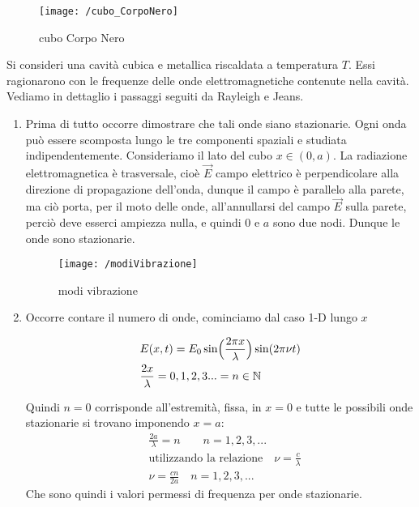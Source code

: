 \begin{figure}[h]
\centering
\texttt{[image: /cubo\_CorpoNero]}
\caption{cubo Corpo Nero}
\end{figure}

Si consideri una cavità cubica e metallica riscaldata a temperatura $T$.
Essi ragionarono con le frequenze delle onde elettromagnetiche contenute nella cavità.
Vediamo in dettaglio i passaggi seguiti da Rayleigh e Jeans.

\begin{enumerate}[label=\Roman{*}.]

\item Prima di tutto occorre dimostrare che tali onde siano stazionarie.
Ogni onda può essere scomposta lungo le tre componenti spaziali e studiata indipendentemente. 
Consideriamo il lato del cubo $x \in (0, a)$.
La radiazione elettromagnetica è trasversale, cioè $\vec{E}$ campo elettrico è perpendicolare alla direzione di propagazione dell'onda, dunque il campo è parallelo alla parete, ma ciò porta, per il moto delle onde, all'annullarsi del campo $\vec{E}$ sulla parete, perciò deve esserci ampiezza nulla, e quindi $0$ e $a$ sono due nodi.
Dunque le onde sono stazionarie.

\begin{figure}[h]
\centering
\texttt{[image: /modiVibrazione]}
\caption{modi vibrazione}
\end{figure}

\item Occorre contare il numero di onde, cominciamo dal caso 1-D lungo $x$
	
\begin{equation}
\begin{split}
& E(x, t) = E_0 \sin \Bigl(  \frac{2 \pi x}{\lambda}  \Bigr) \sin (2\pi \nu t) \\
& \frac{2x}{\lambda} = 0,1,2,3 ... = n \in \mathbb{N}
\end{split}
\end{equation}

Quindi $n=0$ corrisponde all'estremità, fissa, in $x=0$ e tutte le possibili onde stazionarie si trovano imponendo $x=a$:
\begin{equation}
\begin{split}
& \frac{ 2a}{\lambda } = n \quad\quad n = 1,2,3, ... \\
& \mbox{utilizzando la relazione} \quad \nu = \frac{c}{\lambda} \\
& \nu = \frac{ c n }{2a } \quad n = 1,2,3, ...
\end{split}
\end{equation}
Che sono quindi i valori permessi di frequenza per onde stazionarie.


\end{enumerate}
